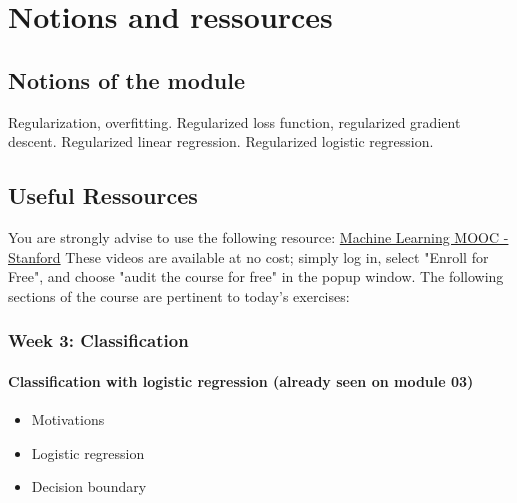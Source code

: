 

\chapter*{Notions and ressources}

\section*{Notions of the module}
Regularization, overfitting. Regularized loss function, regularized gradient descent.  
Regularized linear regression. Regularized logistic regression.

\section*{Useful Ressources}

You are strongly advise to use the following resource:
\href{https://www.coursera.org/learn/machine-learning}{Machine Learning MOOC - Stanford}
These videos are available at no cost; simply log in, select "Enroll for Free", and choose "audit the course for free" in the popup window.
The following sections of the course are pertinent to today's exercises:

\newpage

\subsection*{Week 3: Classification}

\subsubsection*{Classification with logistic regression (already seen on module 03)}
\begin{itemize}
  \item Motivations
  \item Logistic regression
  \item Decision boundary
\end{itemize}


